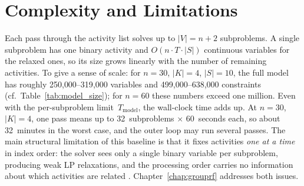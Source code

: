 \section{Complexity and Limitations}
\label{sec:baseline_limits}
Each pass through the activity list solves up to $|V| = n + 2$
subproblems. A single subproblem has one binary activity and
$O(n \cdot T \cdot |S|)$ continuous variables for the relaxed
ones, so its size grows linearly with the number of remaining
activities. To give a sense of scale: for $n = 30$, $|K| = 4$,
$|S| = 10$, the full model has roughly 250{,}000--319{,}000
variables and 499{,}000--638{,}000 constraints
(cf.\ Table~\ref{tab:model_size}); for $n = 60$ these numbers
exceed one million.
Even with the per-subproblem limit~$T_{\mathrm{model}}$, the
wall-clock time adds up. At $n = 30$, $|K| = 4$, one pass means up
to 32~subproblems $\times$ 60~seconds each, so about 32~minutes in
the worst case, and the outer loop may run several passes.
The main structural limitation of this baseline is that it fixes
activities \textit{one at a time} in index order: the solver sees
only a single binary variable per subproblem, producing weak LP
relaxations, and the processing order carries no information
about which activities are related \parencite{helber2010}.
Chapter~\ref{chap:grouprf} addresses both issues.
